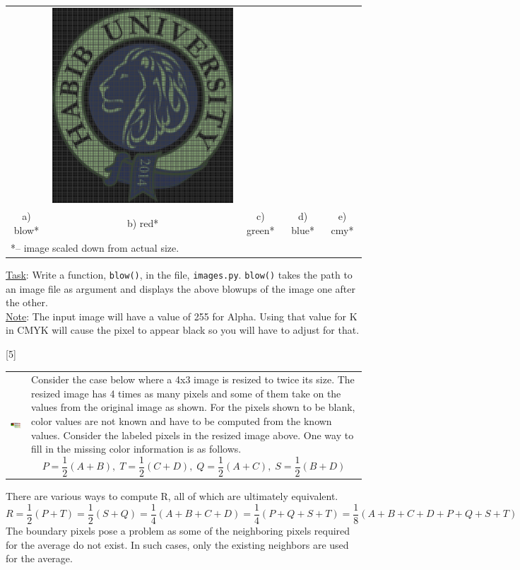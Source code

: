 \documentclass[addpoints]{exam}
\begin{document}
\begin{questions}
\begin{center}
\begin{tabular}{*{5}{c}}
      & \includegraphics[width=.16\textwidth]{logo-cmy}
      \\ a) blow* & b) red* & c) green* & d) blue* & e) cmy*
      \\\multicolumn{5}{l}{*-- image scaled down from actual size.}
    \end{tabular}
  \end{center}
  \underline{Task}: Write a function, \texttt{blow()}, in the file, \texttt{images.py}. \texttt{blow()} takes the path to an image file as argument and displays the above blowups of the image one after the other.\\
  \underline{Note}: The input image will have a value of 255 for Alpha. Using that value for K in CMYK will cause the pixel to appear black so you will have to adjust for that. 
  
[5]
  \noindent\begin{tabularx}{\textwidth}{lX}
    \includegraphics[width=.4\textwidth, align=t]{resize}
    & 
    Consider the case below where a 4x3 image is resized to twice its size. The resized image has 4 times as many pixels and some of them take on the values from the original image as shown. For the pixels shown to be blank, color values are not known and have to be computed from the known values. 
    Consider the labeled pixels in the resized image above. One way to fill in the missing color information is as follows.
    \[
      P = \frac{1}{2}(A + B),\; T = \frac{1}{2}(C + D),\; Q = \frac{1}{2}(A + C),\; S = \frac{1}{2}(B + D)
    \]
  \end{tabularx}
  There are various ways to compute R, all of which are ultimately equivalent.
  \[
    R = \frac{1}{2}(P + T) = \frac{1}{2}(S + Q) =  \frac{1}{4}(A + B + C + D) = \frac{1}{4}(P + Q + S + T) = \frac{1}{8}(A + B + C + D + P + Q + S + T)
  \]
  The boundary pixels pose a problem as some of the neighboring pixels required for the average do not exist. In such cases, only the existing neighbors are used for the average.


\end{questions}
\end{document}
